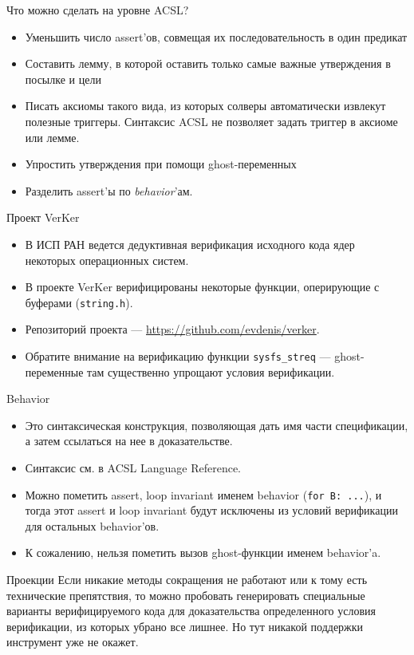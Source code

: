 \documentclass[hyperref={unicode=true}]{beamer}
\begin{document}
    \begin{frame}{Что можно сделать на уровне ACSL?}
    \begin{itemize}
    \item Уменьшить число assert'ов, совмещая их последовательность в один предикат
    \item Составить лемму, в которой оставить только самые важные утверждения в посылке и цели
    \item Писать аксиомы такого вида, из которых солверы автоматически извлекут полезные триггеры. Синтаксис ACSL
    не позволяет задать триггер в аксиоме или лемме.
    \item Упростить утверждения при помощи ghost-переменных
    \item Разделить assert'ы по \emph{behavior}'ам.
    \end{itemize}
    \end{frame}

    \begin{frame}{Проект VerKer}
    \begin{itemize}
    \item В ИСП РАН ведется дедуктивная верификация исходного кода ядер некоторых операционных систем.
    \item В проекте VerKer верифицированы некоторые функции, оперирующие с буферами (\texttt{string.h}).
    \item Репозиторий проекта --- \url{https://github.com/evdenis/verker}.
    \item Обратите внимание на верификацию функции \texttt{sysfs\_streq} --- ghost-переменные там существенно упрощают условия верификации.
    \end{itemize}
    \end{frame}

    \begin{frame}{Behavior}
    \begin{itemize}
    \item Это синтаксическая конструкция, позволяющая дать имя части спецификации, а затем ссылаться на нее в доказательстве.
    \item Синтаксис см. в ACSL Language Reference.
    \item Можно пометить assert, loop invariant именем behavior (\texttt{for B: ...}), и тогда этот assert и loop invariant будут исключены из
    условий верификации для остальных behavior'ов.
    \item К сожалению, нельзя пометить вызов ghost-функции именем behavior'a.
    \end{itemize}
    \end{frame}

    \begin{frame}{Проекции}
    Если никакие методы сокращения не работают или к тому есть технические препятствия, то можно пробовать генерировать специальные
    варианты верифицируемого кода для доказательства определенного условия верификации, из которых убрано все лишнее. Но тут никакой
    поддержки инструмент уже не окажет.
    \end{frame}
\end{document}
